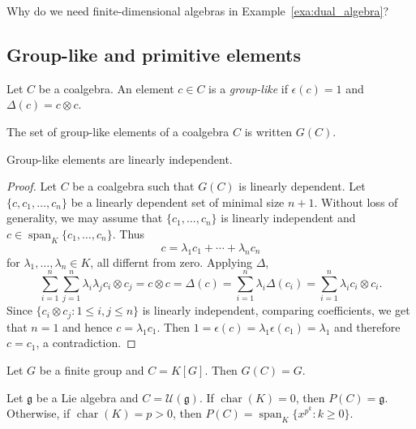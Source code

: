 \documentclass[12pt]{amsproc}
\begin{document}
Why do we need finite-dimensional algebras in Example~\ref{exa:dual_algebra}? 

\subsection{Group-like and primitive elements}

\begin{definition}
    Let $C$ be a coalgebra. An element $c\in C$ is 
    a \emph{group-like} if $\epsilon(c)=1$ and 
    $\Delta(c)=c\otimes c$.  
\end{definition}

The set of group-like elements of a coalgebra $C$ 
is written $G(C)$. 

\begin{proposition}
    Group-like elements are linearly independent. 
\end{proposition}

\begin{proof}
    Let $C$ be a coalgebra such that $G(C)$ is linearly 
    dependent. Let $\{c,c_1,\dots,c_n\}$ be a linearly dependent set of minimal size $n+1$. Without loss of generality, 
    we may assume that 
    $\{c_1,\dots,c_n\}$ is linearly independent and 
    $c\in\operatorname{span}_K\{c_1,\dots,c_n\}$. Thus 
    \[
    c=\lambda_1c_1+\cdots+\lambda_nc_n
    \]
    for $\lambda_1,\dots,\lambda_n\in K$, all differnt from
    zero. 
    Applying $\Delta$, 
    \[
    \sum_{i=1}^{n}\sum_{j=1}^{n}\lambda_i\lambda_jc_i\otimes c_j=c\otimes c=\Delta(c)
    =\sum_{i=1}^{n}\lambda_i\Delta(c_i)
    =\sum_{i=1}^{n}\lambda_ic_i\otimes c_i.
    \]
    Since $\{c_i\otimes c_j:1\leq i,j\leq n\}$ is linearly
    independent, comparing coefficients, we 
    get that $n=1$ and hence $c=\lambda_1c_1$. Then 
    $1=\epsilon(c)=\lambda_1\epsilon(c_1)=\lambda_1$ 
    and therefore $c=c_1$, a contradiction. 
\end{proof}

\begin{example}
    Let $G$ be a finite group and $C=K[G]$. Then 
    $G(C)=G$.  
\end{example}

\begin{definition}
\end{definition}

\begin{example}
    Let $\mathfrak{g}$ be a Lie algebra 
    and $C=\mathcal{U}(\mathfrak{g})$. If $\operatorname{char}(K)=0$, then $P(C)=\mathfrak{g}$. Otherwise, if 
    $\operatorname{char}(K)=p>0$, then 
    $P(C)=\operatorname{span}_K\{x^{p^k}:k\geq0\}$.
\end{example}
\end{document}
